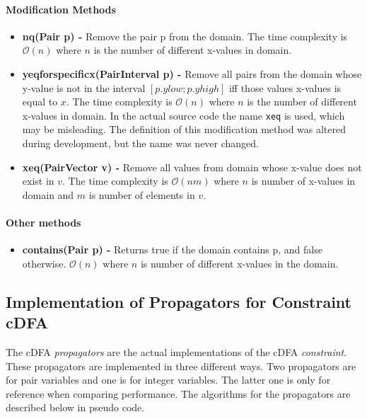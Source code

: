 \documentclass[a4paper,11pt]{article}
\begin{document}
\paragraph{Modification Methods}
\begin{itemize}
\item {\textbf{nq(Pair p) - }} Remove the pair p from the domain. The time complexity is $\mathcal{O}(n)$ where $n$ is the number of different x-values in domain.

\item{\textbf{yeqforspecificx(PairInterval p) - }} Remove all pairs from the domain whose y-value is not in the interval $[p.ylow; p.yhigh]$ iff those values x-values is equal to $x$. The time complexity is $\mathcal{O}(n)$ where $n$ is the number of different x-values in domain. In the actual source code the name \texttt{xeq} is used, which may be misleading. The definition of this modification method was altered during development, but the name was never changed.

\item{\textbf{xeq(PairVector v) - }} Remove all values from domain whose x-value does not exist in $v$. The time complexity is $\mathcal{O}(nm)$ where $n$ is number of x-values in domain and $m$ is number of elements in $v$.
\end{itemize}

\paragraph{Other methods}
\begin{itemize}
\item {\textbf{contains(Pair p) - }} Returns true if the domain contains p, and false otherwise. $\mathcal{O}(n)$ where $n$ is number of different x-values in the domain.
\end{itemize}

\subsection{Implementation of Propagators for Constraint cDFA}
\label{sec:propimp}
The cDFA \textit{propagators} are the actual implementations of the cDFA \textit{constraint}. These propagators are implemented in three different ways. Two propagators are for pair variables and one is for integer variables. The latter one is only for reference when comparing performance. The algorithms for the propagators are described below in pseudo code.
\end{document}
